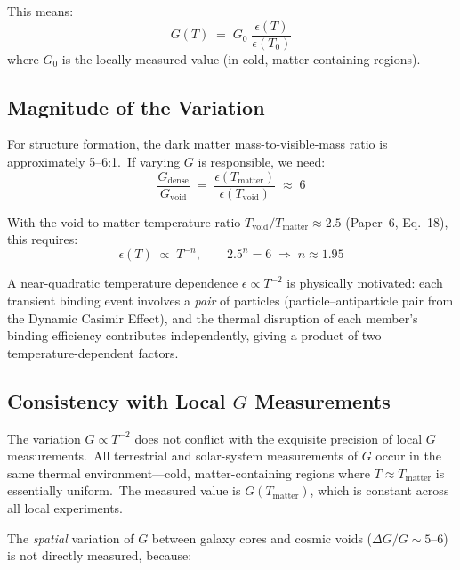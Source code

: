 \documentclass[12pt,letterpaper]{article}
\begin{document}
This means:
%
\begin{equation}
  G(T) \;=\; G_0 \;\frac{\epsilon(T)}{\epsilon(T_0)}
  \label{eq:G-varying}
\end{equation}
%
where $G_0$ is the locally measured value (in cold, matter-containing regions).


\subsection{Magnitude of the Variation}

For structure formation, the dark matter mass-to-visible-mass ratio is
approximately 5--6:1.\ If varying $G$ is responsible, we need:
%
\begin{equation}
  \frac{G_{\mathrm{dense}}}{G_{\mathrm{void}}}
    \;=\; \frac{\epsilon(T_{\mathrm{matter}})}{\epsilon(T_{\mathrm{void}})}
    \;\approx\; 6
  \label{eq:G-ratio}
\end{equation}

With the void-to-matter temperature ratio $T_{\mathrm{void}}/T_{\mathrm{matter}}
\approx 2.5$ (Paper~6, Eq.~18), this requires:
%
\begin{equation}
  \epsilon(T) \;\propto\; T^{-n}, \qquad
  2.5^n = 6 \;\Rightarrow\; n \approx 1.95
  \label{eq:epsilon-power}
\end{equation}

A near-quadratic temperature dependence $\epsilon \propto T^{-2}$ is physically
motivated: each transient binding event involves a \emph{pair} of particles
(particle--antiparticle pair from the Dynamic Casimir Effect), and the thermal
disruption of each member's binding efficiency contributes independently,
giving a product of two temperature-dependent factors.


\subsection{Consistency with Local \texorpdfstring{$G$}{G} Measurements}

The variation $G \propto T^{-2}$ does not conflict with the exquisite precision
of local $G$ measurements.\ All terrestrial and solar-system measurements of $G$
occur in the same thermal environment---cold, matter-containing regions where
$T \approx T_{\mathrm{matter}}$ is essentially uniform.\ The measured value is
$G(T_{\mathrm{matter}})$, which is constant across all local experiments.

The \emph{spatial} variation of $G$ between galaxy cores and cosmic voids
($\Delta G/G \sim 5$--$6$) is not directly measured, because:
\end{document}
